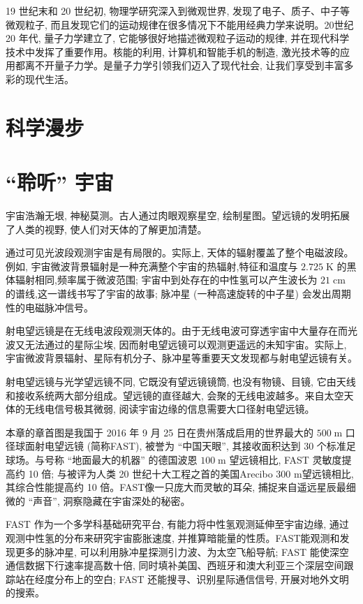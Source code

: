 \documentclass[10pt]{article}
\begin{document}
19 世纪末和 20 世纪初, 物理学研究深入到微观世界, 发现了电子、质子、中子等微观粒子, 而且发现它们的运动规律在很多情况下不能用经典力学来说明。20世纪 20 年代, 量子力学建立了, 它能够很好地描述微观粒子运动的规律, 并在现代科学技术中发挥了重要作用。核能的利用, 计算机和智能手机的制造, 激光技术等的应用都离不开量子力学。是量子力学引领我们迈入了现代社会, 让我们享受到丰富多彩的现代生活。

\section*{科学漫步}

\section*{“聆听” 宇宙}

宇宙浩瀚无垠, 神秘莫测。古人通过肉眼观察星空, 绘制星图。望远镜的发明拓展了人类的视野, 使人们对天体的了解更加清楚。

通过可见光波段观测宇宙是有局限的。实际上, 天体的辐射覆盖了整个电磁波段。例如, 宇宙微波背景辐射是一种充满整个宇宙的热辐射,特征和温度与 \({2.725}\mathrm{\;K}\) 的黑体辐射相同,频率属于微波范围; 宇宙中到处存在的中性氢可以产生波长为 \({21}\mathrm{\;{cm}}\) 的谱线,这一谱线书写了宇宙的故事; 脉冲星 (一种高速旋转的中子星) 会发出周期性的电磁脉冲信号。

射电望远镜是在无线电波段观测天体的。由于无线电波可穿透宇宙中大量存在而光波又无法通过的星际尘埃, 因而射电望远镜可以观测更遥远的未知宇宙。实际上, 宇宙微波背景辐射、星际有机分子、脉冲星等重要天文发现都与射电望远镜有关。

射电望远镜与光学望远镜不同, 它既没有望远镜镜筒, 也没有物镜、目镜, 它由天线和接收系统两大部分组成。望远镜的直径越大, 会聚的无线电波越多。来自太空天体的无线电信号极其微弱, 阅读宇宙边缘的信息需要大口径射电望远镜。

本章的章首图是我国于 2016 年 9 月 25 日在贵州落成启用的世界最大的 \({500}\mathrm{\;m}\) 口径球面射电望远镜 (简称FAST), 被誉为 “中国天眼”, 其接收面积达到 30 个标准足球场。与号称 “地面最大的机器” 的德国波恩 \({100}\mathrm{\;m}\) 望远镜相比, FAST 灵敏度提高约 10 倍; 与被评为人类 20 世纪十大工程之首的美国Arecibo 300 m望远镜相比,其综合性能提高约 10 倍。FAST像一只庞大而灵敏的耳朵, 捕捉来自遥远星辰最细微的 “声音”, 洞察隐藏在宇宙深处的秘密。

FAST 作为一个多学科基础研究平台, 有能力将中性氢观测延伸至宇宙边缘, 通过观测中性氢的分布来研究宇宙膨胀速度, 并推算暗能量的性质。FAST能观测和发现更多的脉冲星, 可以利用脉冲星探测引力波、为太空飞船导航; FAST 能使深空通信数据下行速率提高数十倍, 同时填补美国、西班牙和澳大利亚三个深层空间跟踪站在经度分布上的空白; FAST 还能搜寻、识别星际通信信号, 开展对地外文明的搜索。
\end{document}
